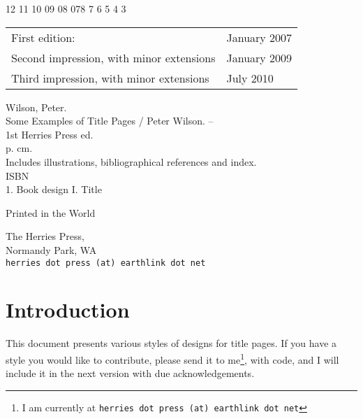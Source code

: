 \documentclass{memoir}
\newcommand*{\plogo}{\fbox{$\mathcal{PL}$}}
\begin{document}
\begin{center}
 12 11 10 09 08 07\hspace{2em}8 7 6 5 4 3 %
\end{center}

\begin{center}
\begin{tabular}{ll}
First edition:  & January 2007 \\
Second impression, with minor extensions & January 2009 \\
Third impression, with minor extensions & July 2010
\end{tabular}
\end{center}

\vfill

Wilson, Peter.\\
\hspace*{2em} Some Examples of Title Pages / Peter Wilson. -- \\
\hspace*{1em} 1st Herries Press ed. \\
\hspace*{2em} p. \hspace*{2em} cm. \\
\hspace*{2em} Includes illustrations, bibliographical references and index. \\
\hspace*{2em} ISBN \\
\hspace*{2em} 1. Book design \hspace*{2em} I. Title


\vfill

Printed in the World

The Herries Press, \\
Normandy Park, WA \\
\texttt{herries dot press (at) earthlink dot net}

\vspace*{2\baselineskip}


\endgroup
\clearpage
\pagestyle{plain}

\tableofcontents
\cleardoublepage
\mainmatter

\chapter{Introduction}

    This document presents various styles of designs for
title pages.
If you have a style you would like to contribute, please send it to
me\footnote{I am currently at \texttt{herries dot press (at) earthlink dot net}},
with code, and I will include it in the next version with due acknowledgements.
\end{document}
